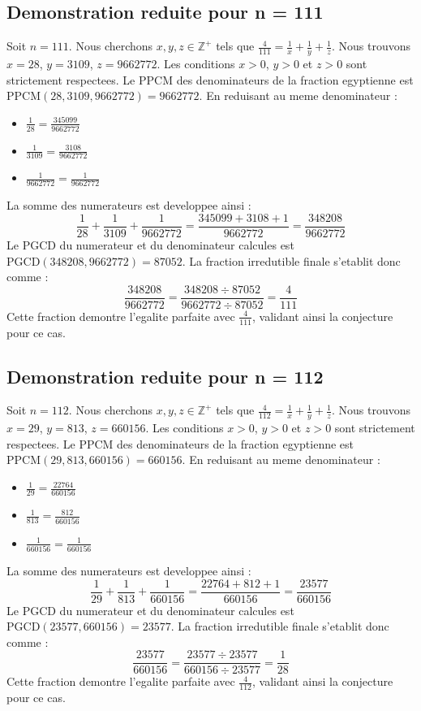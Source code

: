 \documentclass[11pt,a4paper]{article}
\begin{document}
\subsection{Demonstration reduite pour n = 111}
Soit $n = 111$. Nous cherchons $x, y, z \in \mathbb{Z}^{+}$ tels que $\frac{4}{111} = \frac{1}{x} + \frac{1}{y} + \frac{1}{z}$.
Nous trouvons $x = 28$, $y = 3109$, $z = 9662772$.
Les conditions $x > 0$, $y > 0$ et $z > 0$ sont strictement respectees.
Le PPCM des denominateurs de la fraction egyptienne est $\text{PPCM}(28, 3109, 9662772) = 9662772$.
En reduisant au meme denominateur :
\begin{itemize}
    \item $\frac{1}{28} = \frac{345099}{9662772}$
    \item $\frac{1}{3109} = \frac{3108}{9662772}$
    \item $\frac{1}{9662772} = \frac{1}{9662772}$
\end{itemize}
La somme des numerateurs est developpee ainsi :
$$ \frac{1}{28} + \frac{1}{3109} + \frac{1}{9662772} = \frac{345099 + 3108 + 1}{9662772} = \frac{348208}{9662772} $$
Le PGCD du numerateur et du denominateur calcules est $\text{PGCD}(348208, 9662772) = 87052$.
La fraction irredutible finale s'etablit donc comme :
$$ \frac{348208}{9662772} = \frac{348208 \div 87052}{9662772 \div 87052} = \frac{4}{111} $$
Cette fraction demontre l'egalite parfaite avec $\frac{4}{111}$, validant ainsi la conjecture pour ce cas.

\subsection{Demonstration reduite pour n = 112}
Soit $n = 112$. Nous cherchons $x, y, z \in \mathbb{Z}^{+}$ tels que $\frac{4}{112} = \frac{1}{x} + \frac{1}{y} + \frac{1}{z}$.
Nous trouvons $x = 29$, $y = 813$, $z = 660156$.
Les conditions $x > 0$, $y > 0$ et $z > 0$ sont strictement respectees.
Le PPCM des denominateurs de la fraction egyptienne est $\text{PPCM}(29, 813, 660156) = 660156$.
En reduisant au meme denominateur :
\begin{itemize}
    \item $\frac{1}{29} = \frac{22764}{660156}$
    \item $\frac{1}{813} = \frac{812}{660156}$
    \item $\frac{1}{660156} = \frac{1}{660156}$
\end{itemize}
La somme des numerateurs est developpee ainsi :
$$ \frac{1}{29} + \frac{1}{813} + \frac{1}{660156} = \frac{22764 + 812 + 1}{660156} = \frac{23577}{660156} $$
Le PGCD du numerateur et du denominateur calcules est $\text{PGCD}(23577, 660156) = 23577$.
La fraction irredutible finale s'etablit donc comme :
$$ \frac{23577}{660156} = \frac{23577 \div 23577}{660156 \div 23577} = \frac{1}{28} $$
Cette fraction demontre l'egalite parfaite avec $\frac{4}{112}$, validant ainsi la conjecture pour ce cas.
\end{document}
